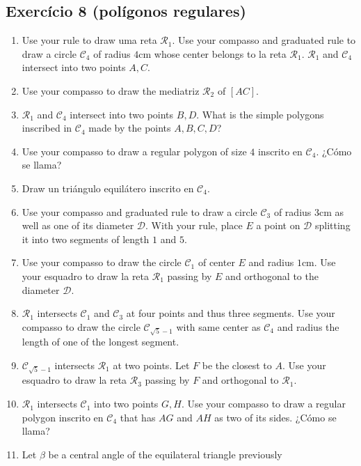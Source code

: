 \subsection*{Exercício 8 (polígonos regulares)}

\begin{enumerate}
\item Use your rule to draw uma reta $\mathcal{R}_1$.
  Use your compasso and graduated rule to draw a circle $\mathcal{C}_4$
  of radius $4\text{cm}$ whose center belongs to la reta $\mathcal{R}_1$.
  $\mathcal{R}_1$ and $\mathcal{C}_4$ intersect into two points $A,C$.
\item Use your compasso to draw the mediatriz $\mathcal{R}_2$ of $[AC]$.
\item $\mathcal{R}_1$ and $\mathcal{C}_4$ intersect into two points $B,D$.
  What is the simple polygons
  inscribed in $\mathcal{C}_4$ made by the points $A,B,C,D$?
\item Use your compasso to draw a regular polygon
  of size $4$ inscrito en $\mathcal{C}_4$. ¿Cómo se llama?
\item Draw un triángulo equilátero inscrito en $\mathcal{C}_4$.
\item Use your compasso and graduated rule to draw a circle $\mathcal{C}_3$
  of radius $3\text{cm}$ as well as one of its diameter $\mathcal{D}$.
  With your rule, place $E$ a
  point on $\mathcal{D}$ splitting it into two segments of length $1$ and $5$.
\item Use your compasso to draw the circle
  $\mathcal{C}_1$ of center $E$ and radius $1\text{cm}$.
  Use your esquadro to draw la reta $\mathcal{R}_1$ passing by $E$
  and orthogonal to the diameter $\mathcal{D}$.
\item $\mathcal{R}_1$ intersects $\mathcal{C}_1$ and $\mathcal{C}_3$ at four
  points and thus three segments. Use
  your compasso to draw the circle $\mathcal{C}_{\sqrt{5}-1}$
  with same center as $\mathcal{C}_4$ and radius the
  length of one of the longest segment.
\item $\mathcal{C}_{\sqrt{5}-1}$ intersects $\mathcal{R}_1$ at two points.
  Let $F$ be the closest to $A$.
  Use your esquadro to draw la reta $\mathcal{R}_3$
  passing by $F$ and orthogonal to $\mathcal{R}_1$.
\item $\mathcal{R}_1$ intersects $\mathcal{C}_1$ into two points $G,H$.
  Use your compasso to draw a regular polygon inscrito en $\mathcal{C}_4$
  that has $AG$ and $AH$ as two of its sides. ¿Cómo se llama?
\item
  Let $\beta$ be a central angle of the equilateral triangle previously

\end{enumerate}
